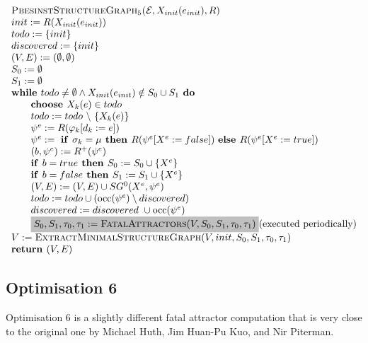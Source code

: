 \documentclass{article}
\newcommand{\Space}{\text{\ }}
\newcommand{\If}{\text{\textbf{if }}}
\newcommand{\Do}{\text{\textbf{ do }}}
\newcommand{\Then}{\text{\textbf{ then }}}
\newcommand{\Else}{\text{\textbf{else }}}
\newcommand{\While}{\text{\textbf{while }}}
\newcommand{\Choose}{\text{\textbf{choose }}}
\newcommand{\Return}{\text{\textbf{return }}}
\begin{document}
\begin{equation*}
\begin{array}{l}
\textsc{PbesinstStructureGraph$_{5}$(}\mathcal{E}, X_{init}(e_{init}), R) \\ 
init:=R(X_{init}(e_{init})) \\
todo:=\{init\} \\
discovered:=\{init\} \\
(V,E) :=(\emptyset ,\emptyset ) \\ 
S_0:= \emptyset \\
S_1:= \emptyset \\
\While todo \neq \emptyset \wedge X_{init}(e_{init}) \notin S_0 \cup S_1 \Do \\ 
\qquad \Choose X_{k}(e)\in todo \\ 
\qquad todo:=todo\ \backslash \ \{X_{k}(e)\} \\ 
\qquad \psi ^{e}:=R(\varphi _{k}[d_{k}:=e]) \\ 
\qquad \psi^e := \Space \If \sigma_k = \mu \Then R(\psi^e[X^e := false])
\Space \Else R(\psi^e[X^e := true]) \\
\qquad (b,\psi^e) := R^+(\psi^e) \\
\qquad \If b = true \Then S_0 := S_0 \cup \{ X^e \} \\
\qquad \If b = false \Then S_1 := S_1 \cup \{ X^e \} \\
\qquad (V,E) := (V,E) \cup SG^{0}(X^{e},\psi ^{e}) \\ 
\qquad todo:=todo\cup (\mathrm{occ}(\psi ^{e})\setminus discovered) \\
\qquad discovered:=discovered\ \cup \mathrm{occ}(\psi ^{e}) \\
\qquad \colorbox{lightgray}{$%
S_0, S_1,\tau_0,\tau_1 := \text{\textsc{FatalAttractors}}(V, S_0, S_1, \tau_0, \tau_1) $} \text{(executed periodically)} \\
V := \textsc{ExtractMinimalStructureGraph}(V, init, S_0, S_1, \tau_0, \tau_1) \\
\Return (V, E)
\end{array}%
\end{equation*}%

\subsection{Optimisation 6}
Optimisation 6 is a slightly different fatal attractor computation that is very close to the
original one by Michael Huth, Jim Huan-Pu Kuo, and Nir Piterman.
\end{document}
